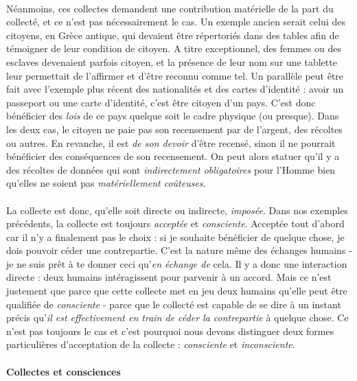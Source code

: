 \paragraph{} Néanmoins, ces collectes demandent une contribution matérielle de la part du collecté, et ce n'est pas
nécessairement le cas. Un exemple ancien serait celui des citoyens, en Grèce antique, qui devaient être répertoriés
dans des tables afin de témoigner de leur condition de citoyen. A titre exceptionnel, des femmes ou des esclaves
devenaient parfois citoyen, et la présence de leur nom sur une tablette leur permettait de l'affirmer et d'être
reconnu comme tel. Un parallèle peut être fait avec l'exemple plus récent des nationalités et des cartes d'identité :
avoir un passeport ou une carte d'identité, c'est être citoyen d'un pays. C'est donc bénéficier des \emph{lois} de ce
pays quelque soit le cadre physique (ou presque). Dans les deux cas, le citoyen ne paie pas son recensement par de l'argent,
des récoltes ou autres. En revanche, il est \emph{de son devoir} d'être recensé, sinon il ne pourrait bénéficier des 
conséquences de son recensement. On peut alors statuer qu'il y a des récoltes de données qui sont \emph{indirectement
obligatoires} pour l'Homme bien qu'elles ne soient pas \emph{matériellement coûteuses}.

\paragraph{} La collecte est donc, qu'elle soit directe ou indirecte, \emph{imposée}. Dans nos exemples précédents,
la collecte est toujours \emph{acceptée} et \emph{consciente}. Acceptée tout d'abord car il n'y a finalement pas le
choix : si je souhaite bénéficier de quelque chose, je dois pouvoir céder une contrepartie. C'est la nature même des
échanges humains - je ne suis prêt à te donner ceci qu'\emph{en échange de} cela. Il y a donc une interaction directe 
: deux humains intéragissent pour parvenir à un accord. Mais ce n'est justement que parce que cette collecte met en
jeu deux humains qu'elle peut être qualifiée de \emph{consciente} - parce que le collecté est capable de se dire à
un instant précis qu'\emph{il est effectivement en train de céder la contrepartie} à quelque chose. Ce n'est pas
toujours le cas et c'est pourquoi nous devons distinguer deux formes particulières d'acceptation de la collecte :
\emph{consciente} et \emph{inconsciente}.   

\paragraph{Collectes et consciences}

